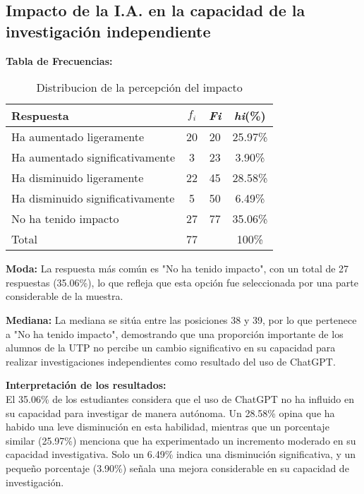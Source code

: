 \subsection{Impacto de la I.A. en la capacidad de la investigación independiente}
\textbf{Tabla de Frecuencias:}
\begin{table}[H]
	\centering
	\renewcommand{\arraystretch}{1.2}
	\begin{tabular}{l c c c}
		\hline
		{Respuesta} & {\(f_i\)} & \textit{Fi} & \textit{hi}(\%)\\
		\hline
		Ha aumentado ligeramente         & 20 & 20 & 25.97\%\\
		Ha aumentado significativamente  & 3  & 23 & 3.90\%\\
		Ha disminuido ligeramente        & 22 & 45 & 28.58\%\\
		Ha disminuido significativamente & 5  & 50 & 6.49\%\\
		No ha tenido impacto             & 27 & 77 & 35.06\%\\
		\hline
		Total                            & 77 &    & 100\%\\
		\hline
	\end{tabular}
	\caption{Distribucion de la percepción del impacto}
	\label{tabla:investigacionIndependiente}
\end{table}

\textbf{Moda:} La respuesta más común es "No ha tenido impacto", con un total de 27 respuestas (35.06\%), lo que refleja que esta opción fue seleccionada por una parte considerable de la muestra.

\textbf{Mediana:} La mediana se sitúa entre las posiciones 38 y 39, por lo que pertenece a "No ha tenido impacto", demostrando que una proporción importante de los alumnos de la UTP no percibe un cambio significativo en su capacidad para realizar investigaciones independientes como resultado del uso de ChatGPT.

\textbf{Interpretación de los resultados:}\\
El 35.06\% de los estudiantes considera que el uso de ChatGPT no ha influido en su capacidad para investigar de manera autónoma. Un 28.58\% opina que ha habido una leve disminución en esta habilidad, mientras que un porcentaje similar (25.97\%) menciona que ha experimentado un incremento moderado en su capacidad investigativa. Solo un 6.49\% indica una disminución significativa, y un pequeño porcentaje (3.90\%) señala una mejora considerable en su capacidad de investigación.
